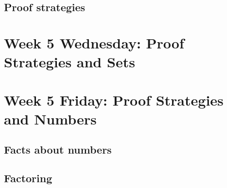 \subsection*{Proof strategies}

%

\vfill

\vfill

\vfill


\newpage
\section*{Week 5 Wednesday: Proof Strategies and Sets}



\newpage


\vfill

\vfill
\newpage


\newpage
%

\newpage
\section*{Week 5 Friday: Proof Strategies and Numbers}

\subsection*{Facts about numbers}


\subsection*{Factoring}

\newpage



\newpage




